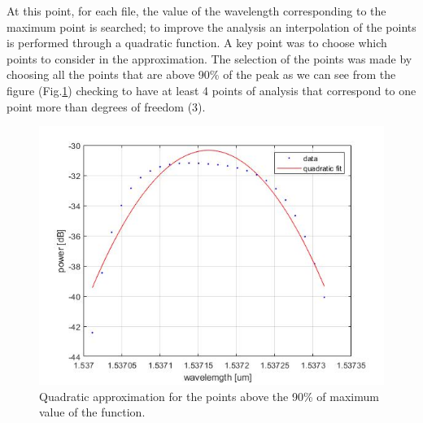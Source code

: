 At this point, for each file, the value of the wavelength corresponding to the maximum point is searched; to improve the analysis an interpolation of the points is performed through a quadratic function. A key point was to choose which points to consider in the approximation.
The selection of the points was made by choosing all the points that are above 90\% of the peak as we can see from the figure (Fig.\ref{fig:peak}) checking to have at least 4 points of analysis that correspond to one point more than degrees of freedom (3).
\begin{figure}[h]
    \centering
    \includegraphics[scale=0.7]{img/peak.jpg}
    \caption{Quadratic approximation for the points above the 90\% of maximum value of the function.}
    \label{fig:peak}
\end{figure}

